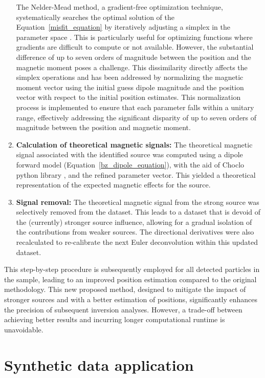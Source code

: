 \begin{enumerate}
{     The Nelder-Mead method, a gradient-free optimization technique, systematically searches the optimal solution of the Equation~\ref{misfit_equation} by iteratively adjusting a simplex in the parameter space \cite{Nelder-Mead1965}. This is particularly useful for optimizing functions where gradients are difficult to compute or not available. However, the substantial difference of up to seven orders of magnitude between the position and the magnetic moment poses a challenge. This dissimilarity directly affects the simplex operations and has been addressed by normalizing the magnetic moment vector using the initial guess dipole magnitude and the position vector with respect to the initial position estimates. This normalization process is implemented to ensure that each parameter falls within a unitary range, effectively addressing the significant disparity of up to seven orders of magnitude between the position and magnetic moment.
     }
    
    \item \textbf{Calculation of theoretical magnetic signals:} The theoretical magnetic signal associated with the identified source was computed using a dipole forward model (Equation~\ref{bz_dipole_equation}), with the aid of Choclo python library \citep{choclo2022}, and the refined parameter vector. This yielded a theoretical representation of the expected magnetic effects for the source.
    
    \item \textbf{Signal removal:} The theoretical magnetic signal from the strong source was selectively removed from the dataset. This leads to a dataset that is devoid of the (currently) stronger source influence, allowing for a gradual isolation of the contributions from weaker sources. The directional derivatives were also recalculated to re-calibrate the next Euler deconvolution within this updated dataset.
 
\end{enumerate}

This step-by-step procedure is subsequently employed for all detected particles in the sample, leading to an improved position estimation compared to the original methodology. This new proposed method, designed to mitigate the impact of stronger sources and with a better estimation of positions, significantly enhances the precision of subsequent inversion analyses. However, a trade-off between achieving better results and incurring longer computational runtime is unavoidable. 


\section{Synthetic data application}

